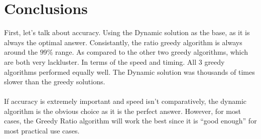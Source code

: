 \documentclass[10pt, letterpaper]{article}
\begin{document}
\section{Conclusions}
First, let's talk about accuracy. Using the Dynamic solution as the base, as it is always the optimal answer. Consistantly, the ratio greedy algorithm is always around the $99\%$ range. As compared to the other two greedy algorithms, which are both very lackluster. In terms of the speed and timing. All 3 greedy algorithms performed equally well. The Dynamic solution was thousands of times slower than the greedy solutions.\\
\\
If accuracy is extremely important and speed isn't comparatively, the dynamic algorithm is the obvious choice as it is the perfect answer. However, for most cases, the Greedy Ratio algorithm will work the best since it is ``good enough'' for most practical use cases.
\end{document}
